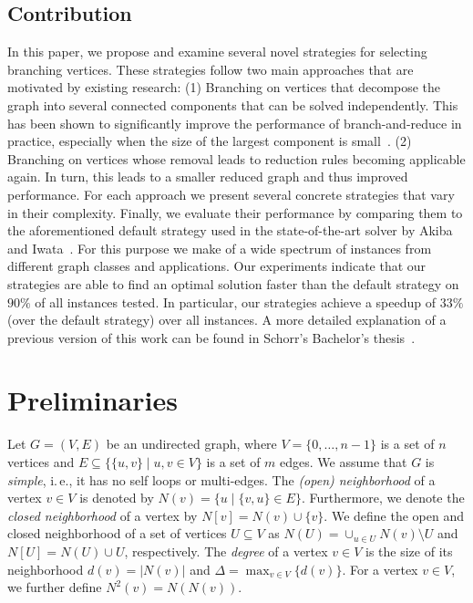 \documentclass[a4paper,UKenglish,cleveref, autoref, thm-restate]{lipics-v2021}
\newcommand{\ie}{i.\,e.,\xspace}
\begin{document}
\subsection{Contribution}
In this paper, we propose and examine several novel strategies for selecting branching vertices.
These strategies follow two main approaches that are motivated by existing research: (1) Branching on vertices that decompose the graph into several connected components that can be solved independently.
This has been shown to significantly improve the performance of branch-and-reduce in practice, especially when the size of the largest component is small~\cite{alsahafy2020computing}.
(2) Branching on vertices whose removal leads to reduction rules becoming applicable again.
In turn, this leads to a smaller reduced graph and thus improved performance.
For each approach we present several concrete strategies that vary in their complexity.
Finally, we evaluate their performance by comparing them to the aforementioned default strategy used in the state-of-the-art solver by Akiba and Iwata~\cite{AkibaIwata}.
For this purpose we make of a wide spectrum of instances from different graph classes and applications.
Our experiments indicate that our strategies are able to find an optimal
solution faster than the default strategy on $90\%$ of all instances tested.
In particular, our strategies achieve a speedup of $33\%$ (over the default strategy) over all instances.
A more detailed explanation of a previous version of this work
can be found in Schorr's Bachelor's thesis~\cite{schorr2020improved}.

\section{Preliminaries}
Let $G=(V,E)$ be an undirected graph, where $V = \{0, \ldots, n-1\}$ is a set of $n$ vertices and $E \subseteq  \{\{u,v\} \mid u,v \in V\}$ is a set of $m$ edges. 
We assume that $G$ is \emph{simple}, \ie it has no self loops or multi-edges.
The \emph{(open) neighborhood} of a vertex $v \in V$ is denoted by $N(v) = \{u \mid \{v,u\} \in E\}$.
Furthermore, we denote the \emph{closed neighborhood} of a vertex by $N[v]=N(v) \cup \{v\}$.
We define the open and closed neighborhood of a set of vertices $U \subseteq V$
as $N(U) = \cup_{u \in U} N(v) \setminus U$ and $N[U] = N(U) \cup U$, respectively.
The \emph{degree} of a vertex $v \in V$ is the size of its neighborhood $d(v) =
|N(v)|$ and $\Delta =
\max_{v \in V} \{d(v)\}$.
For a vertex $v \in V$, we further define $N^2(v) = N(N(v))$.
\end{document}
